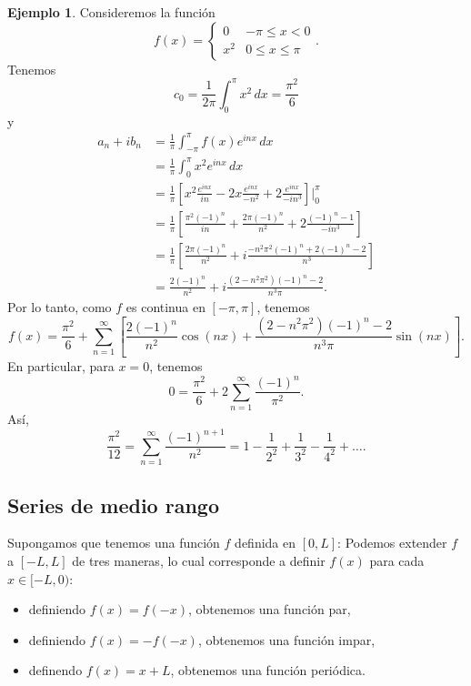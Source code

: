 \documentclass[11pt,letterpaper,draft]{report}
\theoremstyle{plain}
\theoremstyle{definition}
\newtheorem{example}[theorem]{Ejemplo}
\theoremstyle{remark}
\newcommand\<{\langle}
\renewcommand\>{\rangle}
\begin{document}
\begin{example}
  Consideremos la función
  \[
    f(x) =
    \begin{cases}
      0 & -\pi\leq x<0 \\
      x^{2} & 0\leq x\leq\pi
    \end{cases}
  .\]
  Tenemos
  \[
    c_0 = \frac{1}{2\pi}\int_{0}^{\pi}x^{2}\,dx = \frac{\pi^{2}}{6}
  \]
  y
  \begin{align*}
    a_n+ib_n
    &= \frac{1}{\pi}\int_{-\pi}^{\pi}f(x)e^{inx}\,dx \\
    &= \frac{1}{\pi}\int_{0}^{\pi}x^{2}e^{inx}\,dx \\
    &= \frac{1}{\pi}
    \left[
      x^{2}\frac{e^{inx}}{in}
      -
      2x\frac{e^{inx}}{-n^{2}}
      +
      2\frac{e^{inx}}{-in^{3}}
    \right]\Big|_{0}^{\pi}
    \\
    &= \frac{1}{\pi}
    \left[
      \frac{\pi^{2}(-1)^{n}}{in}
      +
      \frac{2\pi(-1)^{n}}{n^{2}}
      +
      2\frac{(-1)^{n}-1}{-in^{3}}
    \right]
    \\
    &= \frac{1}{\pi}
    \left[
      \frac{2\pi(-1)^{n}}{n^{2}}
      +
      i\frac{-n^{2}\pi^{2}(-1)^{n}+2(-1)^{n}-2}{n^{3}}
    \right] \\
    &=
      \frac{2(-1)^{n}}{n^{2}}
      +
      i\frac{(2-n^{2}\pi^{2})(-1)^{n}-2}{n^{3}\pi}.
  \end{align*}
  Por lo tanto, como $f$ es continua en $[-\pi,\pi]$, tenemos
  \[
    f(x)
    =
    \frac{\pi^{2}}{6}
    +
    \sum_{n=1}^{\infty} \left[
      \frac{2(-1)^{n}}{n^{2}}\cos(nx)
      +
      \frac{(2-n^{2}\pi^{2})(-1)^{n}-2}{n^{3}\pi}
      \sin(nx)
    \right]
  .\]
  En particular, para $x=0$, tenemos
  \[
    0
    =
    \frac{\pi^{2}}{6}
    +
    2\sum_{n=1}^{\infty}\frac{(-1)^{n}}{\pi^{2}}
  .\]
  Así,
  \[
    \frac{\pi^{2}}{12}
    =
    \sum_{n=1}^{\infty}\frac{(-1)^{n+1}}{n^{2}}
    =
    1-\frac{1}{2^{2}}+\frac{1}{3^{2}}-\frac{1}{4^{2}}+\dots
  .\]
\end{example}

\subsection{Series de medio rango}

Supongamos que tenemos una función $f$ definida en $[0,L]$:
Podemos extender $f$ a $[-L,L]$ de tres maneras, lo cual corresponde a
definir $f(x)$ para cada $x\in[-L,0)$:
\begin{itemize}
  \item definiendo $f(x)=f(-x)$, obtenemos una función par,
  \item definiendo $f(x)=-f(-x)$, obtenemos una función impar,
  \item definendo $f(x)=x+L$, obtenemos una función periódica.
\end{itemize}
\end{document}
